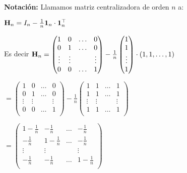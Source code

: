 \begin{frame}

\textbf{Notación:} Llamamos matriz centralizadora  de orden $n$  a:

 $\mathbf{H}_n=I_n-\frac{1}{n} \mathbf{1}_n\cdot \mathbf{1}_n^\top $

Es decir 
$\mathbf{H}_n=\begin{pmatrix}1 & 0 & \ldots & 0\\
0 & 1 & \ldots & 0\\
\vdots & \vdots &  & \vdots\\
0 & 0 & \ldots & 1\\
\end{pmatrix}-\frac{1}{n} \begin{pmatrix}1 \\ 1\\ \vdots \\ 1\end{pmatrix}\cdot (1,1,\ldots,1)$

$
=\begin{pmatrix}1 & 0 & \ldots & 0\\
0 & 1 & \ldots & 0\\
\vdots & \vdots &  & \vdots\\
0 & 0 & \ldots & 1\\
\end{pmatrix}-\frac{1}{n} 
\begin{pmatrix}1 & 1& \ldots & 1\\
1 & 1 & \ldots & 1\\
\vdots & \vdots &  & \vdots\\
1 & 1 & \ldots & 1\\
\end{pmatrix}$

$=\begin{pmatrix}1-\frac{1}{n} & -\frac{1}{n}& \ldots & -\frac{1}{n}\\
-\frac{1}{n} & 1-\frac{1}{n}& \ldots & -\frac{1}{n}\\
\vdots & \vdots &  & \vdots\\
-\frac{1}{n} & -\frac{1}{n} & \ldots & 1-\frac{1}{n}\\
\end{pmatrix}$
\end{frame}

